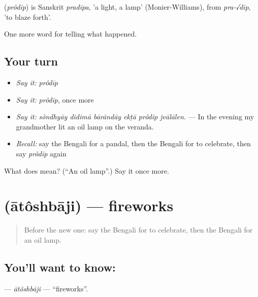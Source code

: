 \begin{cousinweb}
\textbf{} (\emph{prôdīp}) is Sanskrit \emph{pradīpa}, 'a light, a lamp' (Monier-Williams), from \emph{pra-√dīp}, 'to blaze forth'.
\end{cousinweb}

\begin{grammarlens}[title={What you've built}]
One more word for telling what happened.
\end{grammarlens}

\subsection*{Your turn}
\begin{itemize}
\raggedright
  \item \emph{Say it:} \emph{prôdīp}
  \item \emph{Say it:} \emph{prôdīp}, once more
  \item \emph{Say it:} \emph{sôndhyāy didimā bārāndāy ekṭā prôdīp jvālālen.} — In the evening my grandmother lit an oil lamp on the veranda.
  \item \emph{Recall:} say the Bengali for a pandal, then the Bengali for to celebrate, then say \emph{prôdīp} again
\end{itemize}

\begin{tcolorbox}[breakable,colback=teal!4,colframe=teal!35!black,title={Before you move on}]
What does  mean? (\textquotedblleft{}An oil lamp\textquotedblright{}.) Say it once more.
\end{tcolorbox}
\section[\texorpdfstring{\bn{আতশবাজি} (ātôshbāji)}{আতশবাজি (ātôshbāji)}]{ (ātôshbāji) — fireworks}

\label{lesson:BN-C305-atoshbaji}



\begin{quote}
Before the new one: say the Bengali for to celebrate, then the Bengali for an oil lamp.
\end{quote}

\subsection*{You'll want to know: }
\textbf{} — \emph{ātôshbāji} — \textquotedblleft{}fireworks\textquotedblright{}.

